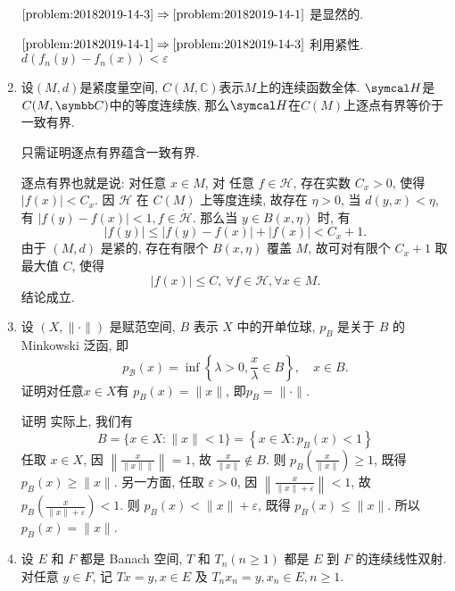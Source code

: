 \begin{enumerate}
\begin{answer}
            $\ref{problem:20182019-14-3}\Rightarrow \ref{problem:20182019-14-1}$ 是显然的.

            $\ref{problem:20182019-14-1}\Rightarrow \ref{problem:20182019-14-3}$ 利用紧性.
            $d\left(f_{n}(y)-f_{n}(x)\right)<\varepsilon$
        \end{answer}
    \item 设$(M,d)$是紧度量空间, $C(M,\mathbb{C})$表示$M$上的连续函数全体. $\cH$是$C(M,\C)$中的等度连续族, 那么$\cH$在$C(M)$上逐点有界等价于一致有界.
        \begin{answer}
            只需证明逐点有界蕴含一致有界. 
            
            逐点有界也就是说: 对任意 $x \in M$, 对 任意 $f \in \mathcal{H}$, 存在实数 $C_{x}>0$, 使得 $|f(x)|<C_{x}$. 因 $\mathcal{H}$ 在 $C(M)$ 上等度连续, 故存在 $\eta>0$, 当 $d(y, x)<
            \eta$, 有 $|f(y)-f(x)|<1, f \in \dot{\mathcal{H}}$. 那么当 $y \in B(x, \eta)$ 时, 有
            \[
                |f(y)| \leq|f(y)-f(x)|+|f(x)|<C_{x}+1 .
            \]
            由于 $(M, d)$ 是紧的, 存在有限个 $B(x, \eta)$ 覆盖 $M$, 故可对有限个 $C_{x}+1$ 取最大值 $C$, 使得
            \[
                |f(x)| \leq C, \, \forall f \in \mathcal{H}, \forall x \in M .
            \]
            结论成立.
        \end{answer}
    \item 设 $(X,\|\cdot\|)$ 是赋范空间, $B$ 表示 $X$ 中的开单位球, $p_{B}$ 是关于 $B$ 的 Minkowski 泛函, 即
    \[
    p_{\mathcal{B}}(x)=\inf\left\{\lambda>0, \frac{x}{\lambda} \in B\right\}, \quad x \in B.
    \] 证明对任意$x\in X$有 $p_B(x)= \|x\|$, 即$p_B=\|\cdot\|$.
        \begin{answer}
            证明 实际上, 我们有
            \[
                B=\{x \in X:\|x\|<1\}=\left\{x \in X: p_{B}(x)<1\right\}
            \]
            任取 $x \in X$, 因 $\left\|\frac{x}{\|x\| \|}\right\|=1$, 故 $\frac{x}{\|x\|} \notin B$. 则 $p_{B}\left(\frac{x}{\|x\|}\right) \geq 1$, 既得 $p_{B}(x) \geq\|x\|$. 另一方面, 任取 $\varepsilon>0$, 因 $\left\|\frac{x}{\|x\|+\varepsilon}\right\|<1$, 故 $p_{B}\left(\frac{x}{\|x\|+\varepsilon}\right)<1$. 则 $p_{B}(x)<\|x\|+\varepsilon$, 既得 $p_{B}(x) \leq\|x\|$. 所以 $p_{B}(x)=\|x\|$.
        \end{answer}
    \item 设 $E$ 和 $F$ 都是 Banach 空间, $T$ 和 $T_{n}(n \geq 1)$ 都是 $E$ 到 $F$ 的连续线性双射. 对任意 $y \in F$, 记 $T x=y, x \in E$ 及 $T_{n} x_{n}=y, x_{n} \in E, n \geq 1$.
        \begin{enumerate}

\end{enumerate}
\end{enumerate}
